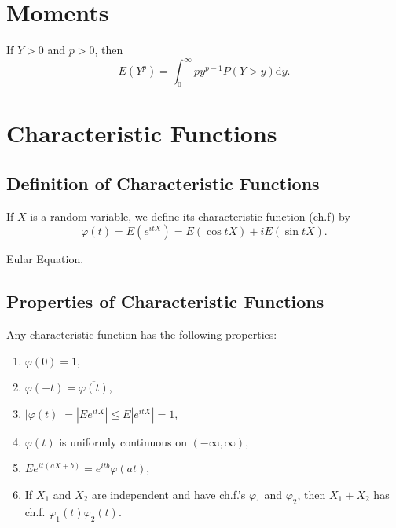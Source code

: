 \section{Moments}

\begin{lemma}
    If $Y>0$ and $p>0$, then
    \begin{equation}
        E(Y^p)=\int_{0}^{\infty}py^{p-1}P(Y>y)\mathrm{d}y.
    \end{equation}
\end{lemma}

\section{Characteristic Functions}

\subsection{Definition of Characteristic Functions}

\begin{definition} \label{def:characteristic-function}
    If $X$ is a random variable, we define its characteristic function (ch.f) by
    \begin{equation}
        \varphi(t)=E\left(e^{itX}\right)=E\left(\cos tX\right)+i E\left(\sin tX\right).
    \end{equation}
\end{definition}

\begin{remark}
    Eular Equation.
\end{remark}

\subsection{Properties of Characteristic Functions}

\begin{theorem} \label{thm:characteristic-function-property}
    Any characteristic function has the following properties:
    \begin{enumerate}
        \item $\varphi(0) = 1$,
        \item $\varphi(-t) = \overline{\varphi(t)}$,
        \item $|\varphi(t)| =|Ee^{itX}| \leq E|e^{itX}| = 1$,
        \item $\varphi(t)$ is uniformly continuous on $(-\infty,\infty)$,
        \item $Ee^{it(aX+b)}=e^{itb}\varphi(at)$,
        \item  If $X_1$ and $X_2$ are independent and have ch.f.'s $\varphi_1$ and $\varphi_2$, then $X_1+X_2$ has ch.f. $\varphi_1(t)\varphi_2(t)$.
    \end{enumerate}
\end{theorem}

